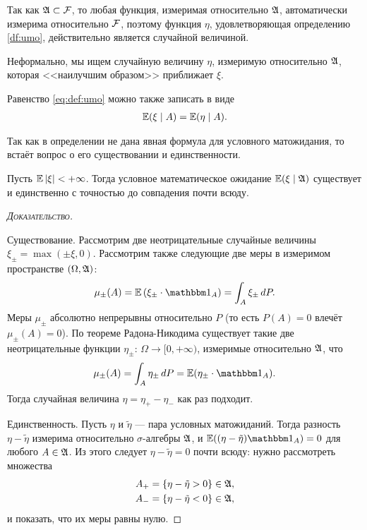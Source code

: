\documentclass[../main.tex]{subfiles}
\begin{document}
\begin{remrk*}
 Так как $ \mathfrak A \subset \mathcal F $, то любая функция, измеримая относительно $ \mathfrak A $, автоматически измерима относительно $ \mathcal F $, поэтому функция $ \eta $, удовлетворяющая определению \ref{df:umo}, действительно является случайной величиной.
\end{remrk*}

Неформально, мы ищем случайную величину $ \eta $, измеримую относительно $ \mathfrak A $, которая <<наилучшим образом>> приближает $ \xi $.

Равенство \eqref{eq:def:umo} можно также записать в виде
\begin{align*}
 \mathbb E(\xi \mid A) = \mathbb E(\eta \mid A).
\end{align*}

Так как в определении не дана явная формула для условного матожидания, то встаёт вопрос о его существовании и единственности.

\begin{thm}
 Пусть $ \mathbb E \left| \xi \right| < +\infty $. Тогда условное математическое ожидание $ \mathbb E(\xi\mid\mathfrak A) $ существует и единственно с точностью до совпадения почти всюду.
\end{thm}
\begin{proof}[\normalfont\textsc{Доказательство}]\

 Существование. Рассмотрим две неотрицательные случайные величины $ \xi_\pm = \max(\pm \xi, 0) $. Рассмотрим также следующие две меры в измеримом пространстве $ (\Omega,\mathfrak A)$:
 \begin{align*}
  \mu_\pm (A) = \E \left( \xi_\pm \cdot \Ind_A \right) = \int_{A} \xi_\pm \,dP. 
 \end{align*} Меры $ \mu_\pm $ абсолютно непрерывны относительно $ P $ (то есть $ P(A) = 0 $ влечёт $ \mu_\pm(A) = 0 $). По теореме Радона-Никодима существует такие две неотрицательные функции $ \eta_\pm \colon\, \Omega \to [0, +\infty)  $, измеримые относительно $ \mathfrak A $, что
 \begin{align*}
  \mu_\pm (A) = \int_{A} \eta_\pm \, dP = \E (\eta_\pm \cdot \Ind_A).
 \end{align*} Тогда случайная величина $ \eta = \eta_+ - \eta_- $ как раз подходит.

 Единственность. Пусть $ \eta $ и $ \tilde \eta $ --- пара условных матожиданий. Тогда
 разность $ \eta - \tilde \eta $ измерима относительно $ \sigma $-алгебры $ \mathfrak A $, и $ \E((\eta-\tilde\eta) \Ind_A) = 0 $ для любого $ A \in \mathfrak A $. Из этого следует $ \eta - \tilde\eta = 0 $ почти всюду: нужно рассмотреть множества
 \begin{align*}
  A_+ &= \left\{ \eta - \tilde\eta > 0 \right\} \in \mathfrak A, \\
  A_- &= \left\{ \eta - \tilde\eta < 0 \right\} \in \mathfrak A,
 \end{align*} и показать, что их меры равны нулю.
\end{proof}
\end{document}
